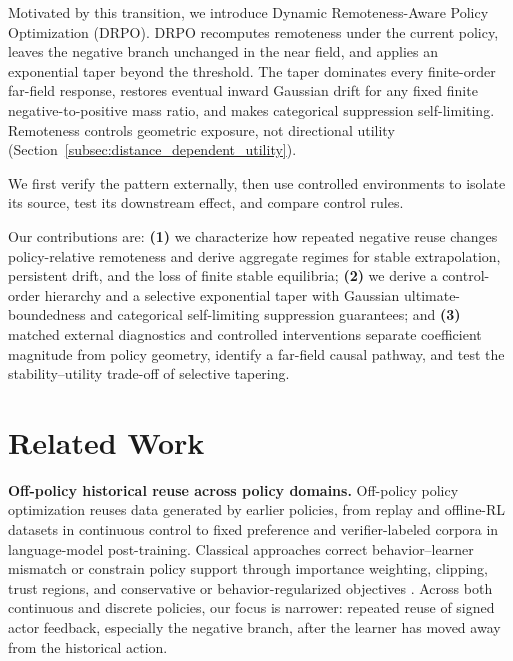\documentclass[sigconf,anonymous,review]{acmart}
\theoremstyle{acmdefinition}
\begin{document}
Motivated by this transition, we introduce Dynamic Remoteness-Aware Policy
Optimization (DRPO). DRPO recomputes remoteness under the current policy,
leaves the negative branch unchanged in the near field, and applies an
exponential taper beyond the threshold. The taper dominates every finite-order
far-field response, restores eventual inward Gaussian drift for any fixed
finite negative-to-positive mass ratio, and makes categorical suppression
self-limiting. Remoteness controls geometric exposure, not directional utility
(Section~\ref{subsec:distance_dependent_utility}).

We first verify the pattern externally, then use controlled environments to
isolate its source, test its downstream effect, and compare control rules.

Our contributions are: \textbf{(1)} we characterize how repeated negative
reuse changes policy-relative remoteness and derive aggregate regimes for
stable extrapolation, persistent drift, and the loss of finite stable
equilibria; \textbf{(2)} we derive a control-order hierarchy and a selective
exponential taper with Gaussian ultimate-boundedness and categorical
self-limiting suppression guarantees; and \textbf{(3)} matched external
diagnostics and controlled interventions separate coefficient magnitude
from policy geometry, identify a far-field causal pathway, and test the
stability--utility trade-off of selective tapering.


\section{Related Work}
\label{sec:related_work}

\textbf{Off-policy historical reuse across policy domains.}
Off-policy policy optimization reuses data generated by earlier policies,
from replay and offline-RL datasets in continuous control to fixed
preference and verifier-labeled corpora in language-model post-training.
Classical approaches correct behavior--learner mismatch or constrain policy
support through importance weighting, clipping, trust regions, and
conservative or behavior-regularized objectives
\citep{precup2000eligibility,munos2016safe,schulman2015trust,
schulman2017proximal,fujimoto2019off,kumar2020conservative,
fujimoto2021minimalist,kostrikov2021offline}. Across both continuous and
discrete policies, our focus is narrower: repeated reuse of signed actor
feedback, especially the negative branch, after the learner has moved away
from the historical action.
\end{document}
